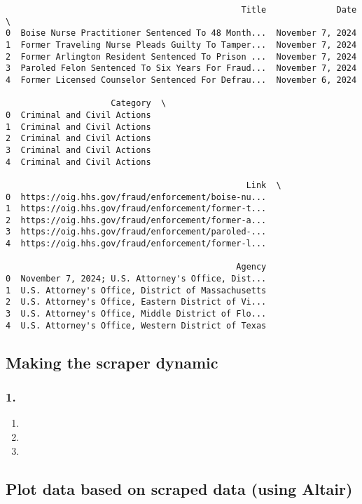 \documentclass[
  letterpaper,
  DIV=11,
  numbers=noendperiod]{scrartcl}
\providecommand{\tightlist}{%
  \setlength{\itemsep}{0pt}\setlength{\parskip}{0pt}}\usepackage{longtable,booktabs,array}
\begin{document}
\begin{verbatim}
                                               Title              Date  \
0  Boise Nurse Practitioner Sentenced To 48 Month...  November 7, 2024   
1  Former Traveling Nurse Pleads Guilty To Tamper...  November 7, 2024   
2  Former Arlington Resident Sentenced To Prison ...  November 7, 2024   
3  Paroled Felon Sentenced To Six Years For Fraud...  November 7, 2024   
4  Former Licensed Counselor Sentenced For Defrau...  November 6, 2024   

                     Category  \
0  Criminal and Civil Actions   
1  Criminal and Civil Actions   
2  Criminal and Civil Actions   
3  Criminal and Civil Actions   
4  Criminal and Civil Actions   

                                                Link  \
0  https://oig.hhs.gov/fraud/enforcement/boise-nu...   
1  https://oig.hhs.gov/fraud/enforcement/former-t...   
2  https://oig.hhs.gov/fraud/enforcement/former-a...   
3  https://oig.hhs.gov/fraud/enforcement/paroled-...   
4  https://oig.hhs.gov/fraud/enforcement/former-l...   

                                              Agency  
0  November 7, 2024; U.S. Attorney's Office, Dist...  
1  U.S. Attorney's Office, District of Massachusetts  
2  U.S. Attorney's Office, Eastern District of Vi...  
3  U.S. Attorney's Office, Middle District of Flo...  
4  U.S. Attorney's Office, Western District of Texas  
\end{verbatim}

\subsection{Making the scraper
dynamic}\label{making-the-scraper-dynamic}

\subsubsection{1.}\label{section-2}

\begin{enumerate}
\def\labelenumi{\alph{enumi}.}
\tightlist
\item
\item
\item
\end{enumerate}

\subsection{Plot data based on scraped data (using
Altair)}\label{plot-data-based-on-scraped-data-using-altair}
\end{document}
